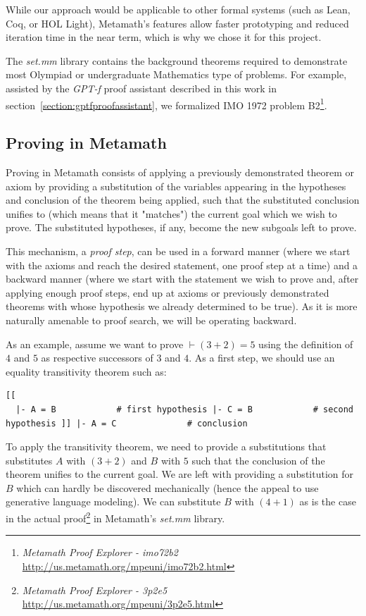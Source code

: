 While our approach would be applicable to other formal systems (such as Lean, Coq, or HOL Light), Metamath's features allow faster prototyping and reduced iteration time in the near term, which is why we chose it for this project.

The \textit{set.mm} library contains the background theorems required to demonstrate most Olympiad or undergraduate Mathematics type of problems. For example, assisted by the \emph{GPT-f} proof assistant described in this work in section~\ref{section:gptfproofassistant}, we formalized IMO 1972 problem B2\footnote{\textit{Metamath Proof Explorer - imo72b2} \url{http://us.metamath.org/mpeuni/imo72b2.html}}.

\subsection{Proving in Metamath}

Proving in Metamath consists of applying a previously demonstrated theorem or axiom by providing a substitution of the variables appearing in the hypotheses and conclusion of the theorem being applied, such that the substituted conclusion unifies to (which means that it "matches") the current goal which we wish to prove.  The substituted hypotheses, if any, become the new subgoals left to prove.

This mechanism, a \textit{proof step}, can be used in a forward manner (where we start with the axioms and reach the desired statement, one proof step at a time) and a backward manner (where we start with the statement we wish to prove and, after applying enough proof steps, end up at axioms or previously demonstrated theorems with whose hypothesis we already determined to be true). As it is more naturally amenable to proof search, we will be operating backward. 

As an example, assume we want to prove $\vdash ( 3 + 2 ) = 5$ using the definition of $4$ and $5$ as respective successors of $3$ and $4$. As a first step, we should use an equality transitivity theorem such as:

\begin{verbatim}
[[
  |- A = B            # first hypothesis |- C = B            # second hypothesis ]] |- A = C              # conclusion
\end{verbatim}

To apply the transitivity theorem, we need to provide a substitutions that substitutes $A$ with $( 3 + 2)$ and $B$ with $5$ such that the conclusion of the theorem unifies to the current goal. We are left with providing a substitution for $B$ which can hardly be discovered mechanically (hence the appeal to use generative language modeling). We can substitute $B$ with $( 4 + 1 )$ as is the case in the actual proof\footnote{\textit{Metamath Proof Explorer - 3p2e5} \url{http://us.metamath.org/mpeuni/3p2e5.html}} in Metamath's \textit{set.mm} library.

